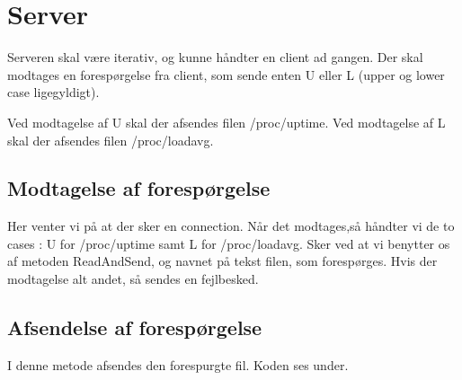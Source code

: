 \newpage
\section{Server}
Serveren skal være iterativ, og kunne håndter en client ad gangen. 
Der skal modtages en forespørgelse fra client, som sende enten U eller L (upper og lower case ligegyldigt). 

Ved modtagelse af U skal der afsendes filen /proc/uptime.
Ved modtagelse af L skal der afsendes filen /proc/loadavg. 



\subsection{Modtagelse af forespørgelse}

Her venter vi på at der sker en connection. Når det modtages,så håndter vi de to cases : 
U for /proc/uptime samt L for /proc/loadavg. Sker ved at vi benytter os af metoden ReadAndSend, og navnet på tekst filen, som forespørges.
Hvis der modtagelse alt andet, så sendes en fejlbesked. 





\subsection{Afsendelse af forespørgelse}

I denne metode afsendes den forespurgte fil. Koden ses under.



